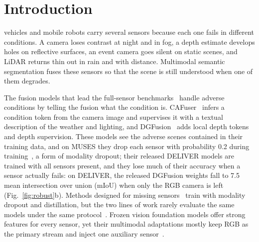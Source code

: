 \section{Introduction}\label{sec:intro}

 vehicles and mobile robots carry several sensors because each one fails in different conditions. A camera loses contrast at night and in fog, a depth estimate develops holes on reflective surfaces, an event camera goes silent on static scenes, and LiDAR returns thin out in rain and with distance. Multimodal semantic segmentation fuses these sensors so that the scene is still understood when one of them degrades.

The fusion models that lead the full-sensor benchmarks~\cite{cmnext2023,cmx2023,stitchfusion2024,geminifusion2024,cafuser2025,dgfusion2026} handle adverse conditions by telling the fusion what the condition is. CAFuser~\cite{cafuser2025} infers a condition token from the camera image and supervises it with a textual description of the weather and lighting, and DGFusion~\cite{dgfusion2026} adds local depth tokens and depth supervision. These models see the adverse scenes contained in their training data, and on MUSES they drop each sensor with probability 0.2 during training~\cite{muses2024,cafuser2025}, a form of modality dropout; their released DELIVER models are trained with all sensors present, and they lose much of their accuracy when a sensor actually fails: on DELIVER, the released DGFusion weights fall to 7.5 mean intersection over union (mIoU) when only the RGB camera is left (Fig.~\ref{fig:robust}b). Methods designed for missing sensors~\cite{magic2024,liu2024fpt,anyseg2024,rmmss2025,fuseadapt2026} train with modality dropout and distillation, but the two lines of work rarely evaluate the same models under the same protocol~\cite{mmssbench2025}. Frozen vision foundation models offer strong features for every sensor, yet their multimodal adaptations mostly keep RGB as the primary stream and inject one auxiliary sensor~\cite{mmsamadapter2025}.

